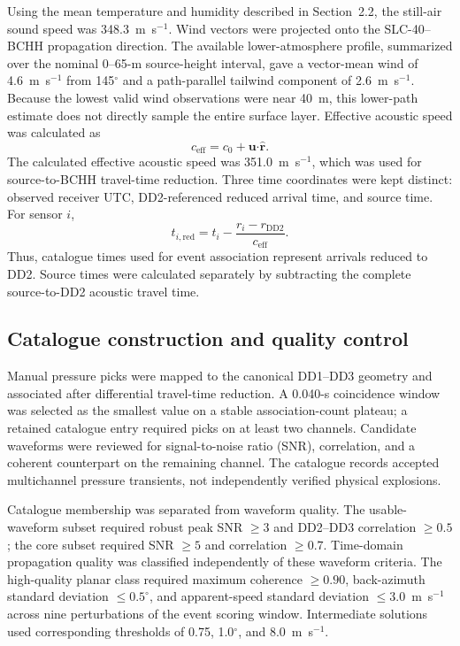\documentclass[]{seismica}
\begin{document}
Using the mean temperature and humidity described in Section~2.2, the
still-air sound speed was 348.3~m~s$^{-1}$. Wind vectors were projected onto
the SLC-40--BCHH propagation direction. The available lower-atmosphere profile,
summarized over the nominal 0--65-m source-height interval, gave a vector-mean
wind of 4.6~m~s$^{-1}$ from 145$^\circ$ and a path-parallel tailwind component
of 2.6~m~s$^{-1}$. Because the lowest valid wind observations were near 40~m,
this lower-path estimate does not directly sample the entire surface layer.
Effective acoustic speed was calculated as
\begin{equation}
 c_{\mathrm{eff}}=c_0+\mathbf{u}\boldsymbol{\cdot}\hat{\mathbf{r}}.
 \label{eq:effective_speed}
\end{equation}
The calculated effective acoustic speed was 351.0~m~s$^{-1}$, which was used
for source-to-BCHH travel-time reduction.
Three time coordinates were kept distinct: observed
receiver UTC, DD2-referenced reduced arrival time, and source time. For sensor
$i$,
\begin{equation}
 t_{i,\mathrm{red}}=t_i-\frac{r_i-r_{\mathrm{DD2}}}{c_{\mathrm{eff}}}.
 \label{eq:reduced_time}
\end{equation}
Thus, catalogue times used for event association represent arrivals reduced
to DD2. Source times were calculated separately by subtracting the complete
source-to-DD2 acoustic travel time.

\subsection{Catalogue construction and quality control}

Manual pressure picks were mapped to the canonical DD1--DD3 geometry and
associated after differential travel-time reduction. A 0.040-s coincidence
window was selected as the smallest value on a stable association-count
plateau; a retained catalogue entry required picks on at least two channels.
Candidate waveforms were reviewed for signal-to-noise ratio (SNR), correlation,
and a coherent counterpart on the remaining channel. The catalogue records
accepted multichannel pressure transients, not independently verified physical
explosions.

Catalogue membership was separated from waveform quality. The
usable-waveform subset required robust peak SNR $\geq3$ and DD2--DD3
correlation $\geq0.5$; the core subset required SNR $\geq5$ and correlation
$\geq0.7$. Time-domain propagation quality was classified independently of
these waveform criteria. The high-quality planar class required maximum
coherence $\geq0.90$, back-azimuth standard deviation
$\leq0.5^\circ$, and apparent-speed standard deviation
$\leq3.0$~m~s$^{-1}$ across nine perturbations of the event scoring window.
Intermediate solutions used corresponding thresholds of 0.75,
1.0$^\circ$, and 8.0~m~s$^{-1}$.
\end{document}
